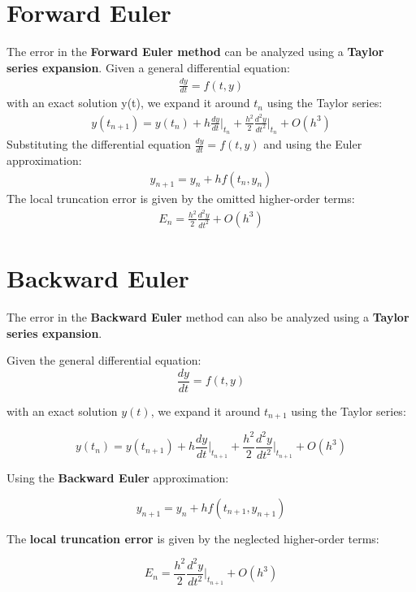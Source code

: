\documentclass[12pt,a4paper]{report}
\begin{document}
\section{Forward Euler}
The error in the \textbf{Forward Euler method} can be analyzed using a \textbf{Taylor series expansion}. Given a general differential equation:
\begin{align}
    \frac{dy}{dt}=f(t,y)
\end{align}
with an exact solution y(t), we expand it around $t_{n}$ using the Taylor series:
\begin{align}
    y(t_{n+1})=y(t_{n})+h\frac{dy}{dt}\Big|_{t_n}+\frac{h^2}{2}\frac{d^2y}{dt^2}\Big|_{t_n}+O(h^3)
\end{align}
Substituting the differential equation $\frac{dy}{dt}=f(t,y)$ and using the Euler approximation:
\begin{align}
    y_{n+1}=y_{n}+hf(t_{n},y_{n})
\end{align}
The local truncation error is given by the omitted higher-order terms:
\begin{align}
    E_{n}=\frac{h^2}{2}\frac{d^2y}{dt^2}+O(h^3)
\end{align}
\section{Backward Euler}
The error in the \textbf{Backward Euler} method can also be analyzed using a \textbf{Taylor series expansion}.  

Given the general differential equation:  
\begin{equation}
\frac{dy}{dt} = f(t, y)
\end{equation}

with an exact solution $ y(t) $, we expand it around $ t_{n+1} $ using the Taylor series:  

\begin{equation}
y(t_n) = y(t_{n+1}) + h \frac{dy}{dt} \bigg|_{t_{n+1}} + \frac{h^2}{2} \frac{d^2y}{dt^2} \bigg|_{t_{n+1}} + O(h^3)
\end{equation}

Using the \textbf{Backward Euler} approximation:

\begin{equation}
y_{n+1} = y_n + h f(t_{n+1}, y_{n+1})
\end{equation}

The \textbf{local truncation error} is given by the neglected higher-order terms:

\begin{equation}
E_n = \frac{h^2}{2} \frac{d^2y}{dt^2} \bigg|_{t_{n+1}} + O(h^3)
\end{equation}
\end{document}
